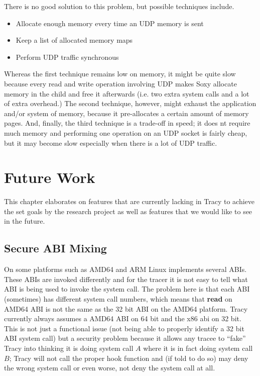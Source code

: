 \documentclass[a4paper, 10pt]{report}
\begin{document}
There is no good solution to this problem, but possible techniques include.

\begin{itemize}
\item Allocate enough memory every time an UDP memory is sent
\item Keep a list of allocated memory maps
\item Perform UDP traffic synchronous
\end{itemize}

Whereas the first technique remains low on memory, it might be quite slow
because every read and write operation involving UDP makes Soxy allocate
memory in the child and free it afterwards (i.e. two extra system calls and a
lot of extra overhead.) The second technique, however, might exhaust the
application and/or system of memory, because it pre-allocates a certain amount
of memory pages. And, finally, the third technique is a trade-off in speed; it
does nt require much memory and performing one operation on an UDP socket is
fairly cheap, but it may become slow especially when there is a lot of UDP
traffic.

\chapter{Future Work}

This chapter elaborates on features that are currently lacking in Tracy to
achieve the set goals by the research project as well as features that we would
like to see in the future.

\section{Secure ABI Mixing}
\label{secure-abi}

On some platforms such as AMD64 and ARM Linux implements several ABIs.
These ABIs are invoked differently and for the tracer it is not easy to
tell what ABI is being used to invoke the system call.
The problem here is that each ABI (sometimes) has different system call
numbers, which means that \textbf{read} on AMD64 ABI is not the same
as the 32 bit ABI on the AMD64 platform. Tracy currently always assumes
a AMD64 ABI on 64 bit and the x86 abi on 32 bit.
This is not just a functional issue (not being able to properly identify a 32
bit ABI system call) but a security problem because it
allows any tracee to ``fake'' Tracy into thinking it is doing system call $A$
where it is in fact doing system call $B$; Tracy will not call the proper hook
function and (if told to do so) may deny the wrong system call or even worse,
not deny the system call at all. \\
\end{document}

